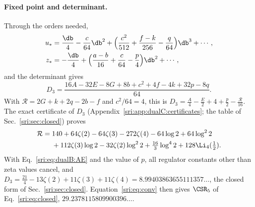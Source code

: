 \paragraph{Fixed point and determinant.} Through the orders needed,
\begin{equation}
\begin{aligned}
 u_*&=\frac\db4-\frac c{64}\db^2+\Bigl(\frac{c^2}{512}+\frac{f-k}{256}-\frac q{64}\Bigr)\db^3+\cdots,\\
 z_*&=-\frac\db4+\Bigl(\frac{a-b}{16}+\frac c{64}-\frac p4\Bigr)\db^2+\cdots,
\end{aligned}
\label{sri:eq:dualB:fixedpoint}
\end{equation}
and the determinant gives
\begin{equation}
 D_3=\frac{16A-32E-8G+8b+c^2+4f-4k+32p-8q}{64}.
 \label{sri:eq:dualB:D3assembly}
\end{equation}
With $\mathcal R=2G+k+2q-2b-f$ and $c^2/64=4$, this is $D_3=\frac A4-\frac E2+4+\frac p2-\frac{\mathcal R}{16}$. The
exact certificate of $D_3$ (Appendix~\ref{sri:app:dualC:certificates}; the table of Sec.~\ref{sri:sec:closed}) proves
\begin{equation}
\begin{aligned}
 \mathcal R={}&140+64\zeta(2)-64\zeta(3)-272\zeta(4)-64\log2+64\log^22\\
 &+112\zeta(3)\log2-32\zeta(2)\log^22+\tfrac{16}{3}\log^42+128\Li_4(\tfrac12).
\end{aligned}
\label{sri:eq:dualB:calR}
\end{equation}
With Eq.~\eqref{sri:eq:dualB:AE} and the value of $p$, all regulator constants other than zeta values cancel, and
$D_3=\frac{21}{4}-13\zeta(2)+11\zeta(3)+11\zeta(4)=8.99403863655111357\ldots$, the closed form of
Sec.~\ref{sri:sec:closed}. Equation~\eqref{sri:eq:conv} then gives $\CSR_5$ of Eq.~\eqref{sri:eq:closed},
$29.2378115809900396\ldots$.

